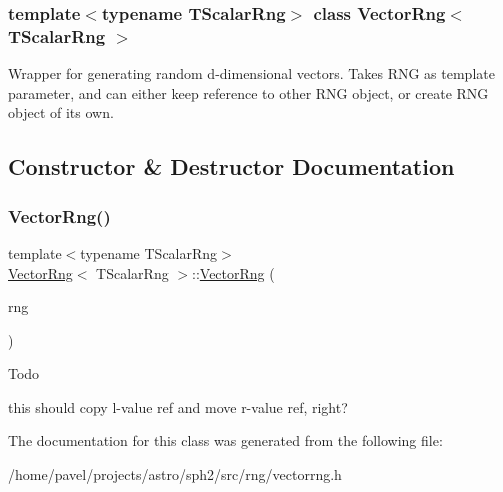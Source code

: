 \subsubsection*{template$<$typename T\+Scalar\+Rng$>$\newline
class Vector\+Rng$<$ T\+Scalar\+Rng $>$}

Wrapper for generating random d-\/dimensional vectors. Takes R\+NG as template parameter, and can either keep reference to other R\+NG object, or create R\+NG object of its own. 

\subsection{Constructor \& Destructor Documentation}
\hypertarget{classVectorRng_af12715177fe686a88c27cedec337cd4b}{}\label{classVectorRng_af12715177fe686a88c27cedec337cd4b} 
\subsubsection{\texorpdfstring{Vector\+Rng()}{VectorRng()}}
{\footnotesize\ttfamily template$<$typename T\+Scalar\+Rng$>$ \\
\hyperlink{classVectorRng}{Vector\+Rng}$<$ T\+Scalar\+Rng $>$\+::\hyperlink{classVectorRng}{Vector\+Rng} (\begin{DoxyParamCaption}\item[{T\+Scalar\+Rng \&\&}]{rng }\end{DoxyParamCaption})\hspace{0.3cm}{\ttfamily [inline]}}

\begin{DoxyRefDesc}{Todo}
\item[\hyperlink{todo__todo000021}{Todo}]this should copy l-\/value ref and move r-\/value ref, right? \end{DoxyRefDesc}


The documentation for this class was generated from the following file\+:\begin{DoxyCompactItemize}
\item 
/home/pavel/projects/astro/sph2/src/rng/vectorrng.\+h\end{DoxyCompactItemize}

